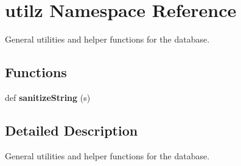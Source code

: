 \hypertarget{namespaceutilz}{}\section{utilz Namespace Reference}
\label{namespaceutilz}


General utilities and helper functions for the database.  


\subsection*{Functions}
\begin{DoxyCompactItemize}
\item 
\mbox{\label{namespaceutilz_a9d690a7848d27af294873927bf5ace17}} 
def {\bfseries sanitize\+String} (s)
\end{DoxyCompactItemize}


\subsection{Detailed Description}
General utilities and helper functions for the database. 